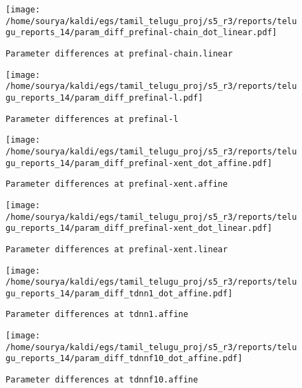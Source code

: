 \documentclass[prl,10pt,twocolumn]{revtex4}
\begin{document}
\newpage
\begin{figure}[h]
  \begin{center}
    \caption{\texttt{Parameter differences at prefinal-chain.linear}}
    \texttt{[image: /home/sourya/kaldi/egs/tamil\_telugu\_proj/s5\_r3/reports/telugu\_reports\_14/param\_diff\_prefinal-chain\_dot\_linear.pdf]}
  \end{center}
\end{figure}
\clearpage


\newpage
\begin{figure}[h]
  \begin{center}
    \caption{\texttt{Parameter differences at prefinal-l}}
    \texttt{[image: /home/sourya/kaldi/egs/tamil\_telugu\_proj/s5\_r3/reports/telugu\_reports\_14/param\_diff\_prefinal-l.pdf]}
  \end{center}
\end{figure}
\clearpage


\newpage
\begin{figure}[h]
  \begin{center}
    \caption{\texttt{Parameter differences at prefinal-xent.affine}}
    \texttt{[image: /home/sourya/kaldi/egs/tamil\_telugu\_proj/s5\_r3/reports/telugu\_reports\_14/param\_diff\_prefinal-xent\_dot\_affine.pdf]}
  \end{center}
\end{figure}
\clearpage


\newpage
\begin{figure}[h]
  \begin{center}
    \caption{\texttt{Parameter differences at prefinal-xent.linear}}
    \texttt{[image: /home/sourya/kaldi/egs/tamil\_telugu\_proj/s5\_r3/reports/telugu\_reports\_14/param\_diff\_prefinal-xent\_dot\_linear.pdf]}
  \end{center}
\end{figure}
\clearpage


\newpage
\begin{figure}[h]
  \begin{center}
    \caption{\texttt{Parameter differences at tdnn1.affine}}
    \texttt{[image: /home/sourya/kaldi/egs/tamil\_telugu\_proj/s5\_r3/reports/telugu\_reports\_14/param\_diff\_tdnn1\_dot\_affine.pdf]}
  \end{center}
\end{figure}
\clearpage


\newpage
\begin{figure}[h]
  \begin{center}
    \caption{\texttt{Parameter differences at tdnnf10.affine}}
    \texttt{[image: /home/sourya/kaldi/egs/tamil\_telugu\_proj/s5\_r3/reports/telugu\_reports\_14/param\_diff\_tdnnf10\_dot\_affine.pdf]}
  \end{center}
\end{figure}
\clearpage
\end{document}
